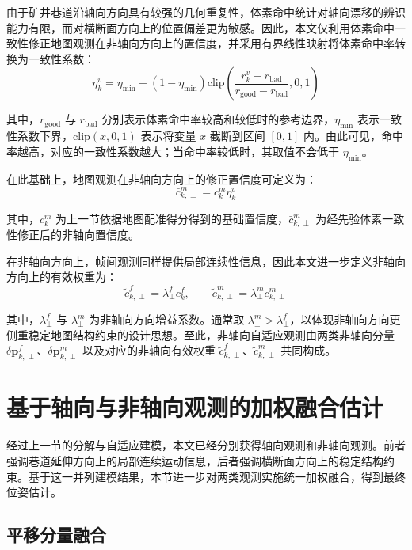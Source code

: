 由于矿井巷道沿轴向方向具有较强的几何重复性，体素命中统计对轴向漂移的辨识能力有限，而对横断面方向上的位置偏差更为敏感。因此，本文仅利用体素命中一致性修正地图观测在非轴向方向上的置信度，并采用有界线性映射将体素命中率转换为一致性系数：
\begin{equation}
\eta_{k}^{v}
=
\eta_{\min}
+\left(1-\eta_{\min}\right)
\mathrm{clip}
\left(
\frac{r_{k}^{v}-r_{\mathrm{bad}}}{r_{\mathrm{good}}-r_{\mathrm{bad}}},
0,1
\right)
\end{equation}

其中，$r_{\mathrm{good}}$ 与 $r_{\mathrm{bad}}$ 分别表示体素命中率较高和较低时的参考边界，$\eta_{\min}$ 表示一致性系数下界，$\mathrm{clip}(x,0,1)$ 表示将变量 $x$ 截断到区间 $[0,1]$ 内。由此可见，命中率越高，对应的一致性系数越大；当命中率较低时，其取值不会低于 $\eta_{\min}$。

在此基础上，地图观测在非轴向方向上的修正置信度可定义为：
\begin{equation}
\bar{c}_{k,\perp}^{m}
=
c_{k}^{m}\eta_{k}^{v}
\end{equation}

其中，$c_{k}^{m}$ 为上一节依据地图配准得分得到的基础置信度，$\bar{c}_{k,\perp}^{m}$ 为经先验体素一致性修正后的非轴向置信度。

在非轴向方向上，帧间观测同样提供局部连续性信息，因此本文进一步定义非轴向方向上的有效权重为：
\begin{equation}
\tilde{c}_{k,\perp}^{f}
=
\lambda_{\perp}^{f}c_{k}^{f},
\qquad
\tilde{c}_{k,\perp}^{m}
=
\lambda_{\perp}^{m}\bar{c}_{k,\perp}^{m}
\end{equation}

其中，$\lambda_{\perp}^{f}$ 与 $\lambda_{\perp}^{m}$ 为非轴向方向增益系数。通常取 $\lambda_{\perp}^{m}>\lambda_{\perp}^{f}$，以体现非轴向方向更侧重稳定地图结构约束的设计思想。至此，非轴向自适应观测由两类非轴向分量 $\delta \mathbf{p}_{k,\perp}^{f}$、$\delta \mathbf{p}_{k,\perp}^{m}$ 以及对应的非轴向有效权重 $\tilde{c}_{k,\perp}^{f}$、$\tilde{c}_{k,\perp}^{m}$ 共同构成。

\section{基于轴向与非轴向观测的加权融合估计}

经过上一节的分解与自适应建模，本文已经分别获得轴向观测和非轴向观测。前者强调巷道延伸方向上的局部连续运动信息，后者强调横断面方向上的稳定结构约束。基于这一并列建模结果，本节进一步对两类观测实施统一加权融合，得到最终位姿估计。

\subsection{平移分量融合}

